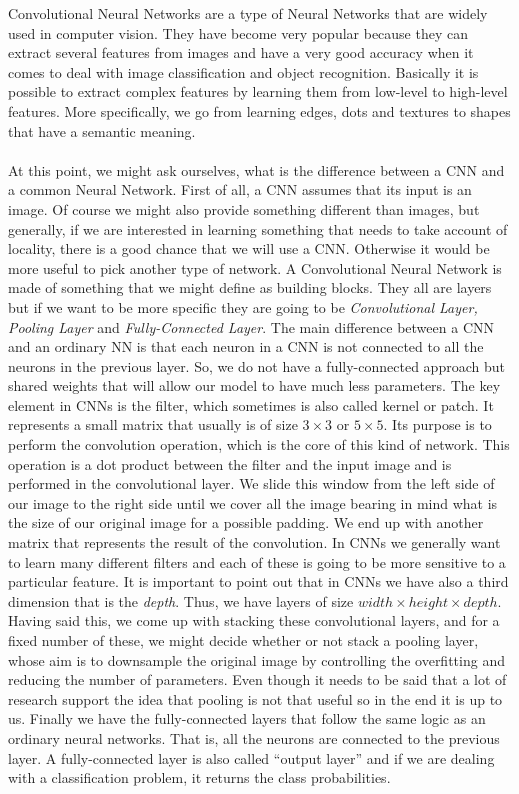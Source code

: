 Convolutional Neural Networks are a type of Neural Networks that are widely used in computer vision. They have become very popular because they can extract several features from images and have a very good accuracy when it comes to deal with image classification and object recognition. Basically it is possible to extract complex features by learning them from low-level to high-level features. More specifically, we go from learning edges, dots and textures to shapes that have a semantic meaning.\\ \\
At  this  point,  we  might  ask  ourselves,  what  is  the  difference  between a  CNN  and a common Neural Network. First of all, a CNN assumes that its input is an image. Of course we might also provide something different than images, but generally, if we are interested in learning something that needs to take account of locality, there is a good chance that we will use a CNN. Otherwise it would be more useful to pick another type of network. A Convolutional Neural Network is made of something that we might define as building blocks. They all are layers but if we want to be more specific they are going to be \textit{Convolutional Layer, Pooling Layer} and \textit{Fully-Connected Layer}. The main difference between a CNN and an ordinary NN is that each neuron in a CNN is not connected to all the neurons in the previous layer. So, we do not have a fully-connected approach but shared weights that will allow our model to have much less parameters. The key element in CNNs is the filter, which sometimes is also called kernel or patch. It represents a small matrix that usually is of size $3 \times 3$ or $5 \times 5$. Its purpose is to perform the convolution operation, which is the core of this kind of network. This operation is a dot product between the filter and the input image and is performed in the convolutional layer. We slide this window from the left side of our image to the right side until we cover all the image bearing in mind what is the size of our original image for a possible padding. We end up with another matrix that represents the result of the convolution. In CNNs we generally want to learn many different filters and each of these is going to be more sensitive to a particular feature. It is important to point out that in CNNs we have also a third dimension that is the \textit{depth}. Thus, we have layers of size $width \times height \times depth$. Having said this, we come up with stacking these convolutional layers, and for a fixed number of these, we might decide whether or not stack a pooling layer, whose aim is to downsample the original image by controlling the overfitting and reducing the number of parameters. Even though it needs to be said that a lot of research support the idea that pooling is not that useful so in the end it is up to us. Finally we have the fully-connected layers that follow the same logic as an ordinary neural networks. That is, all the neurons are connected to the previous layer. A fully-connected layer is also called ``output layer'' and if we are dealing with a classification problem, it returns the class probabilities.

